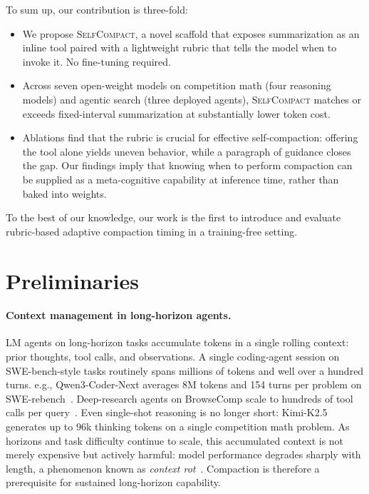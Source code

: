 \documentclass{article}
\newcommand{\method}{\textsc{{SelfCompact}}}
\begin{document}
To sum up, our contribution is three-fold:
\begin{itemize}[leftmargin=*]
\item  We propose \method{}, a novel scaffold that exposes summarization as an inline tool paired with a lightweight rubric that tells the model when to invoke it. No fine-tuning required.
\item  Across seven open-weight models on competition math (four reasoning models) and agentic search (three deployed agents), \method{} matches or exceeds fixed-interval summarization at substantially lower token cost.
\item Ablations find that the rubric is crucial for effective self-compaction: offering the tool alone yields uneven behavior, while a paragraph of guidance closes the gap. Our findings imply that knowing when to perform compaction can be supplied as a meta-cognitive capability at inference time, rather than baked into weights.
\end{itemize}

To the best of our knowledge, our work is the first to introduce and evaluate rubric-based adaptive compaction timing in a training-free setting.

\section{Preliminaries}

\paragraph{Context management in long-horizon agents.} LM agents on long-horizon tasks accumulate tokens in a single rolling context: prior thoughts, tool calls, and observations. A single coding-agent session on SWE-bench-style tasks routinely spans millions of tokens and well over a hundred turns. e.g., Qwen3-Coder-Next averages 8M tokens and 154 turns per problem on SWE-rebench~\citep{badertdinov2026swerebench}. Deep-research agents on BrowseComp scale to hundreds of tool calls per query~\citep{wei2025browsecompsimplechallengingbenchmark, miromindteam2026mirothinkerpushingperformanceboundaries}. Even single-shot reasoning is no longer short: Kimi-K2.5 \citep{kimiteam2026kimik25visualagentic} generates up to 96k thinking tokens on a single competition math problem. As horizons and task difficulty continue to scale, this accumulated context is not merely expensive but actively harmful: model performance degrades sharply with length, a phenomenon known as \emph{context rot}~\citep{hong2025context}. Compaction is therefore a prerequisite for sustained long-horizon capability.
\end{document}
